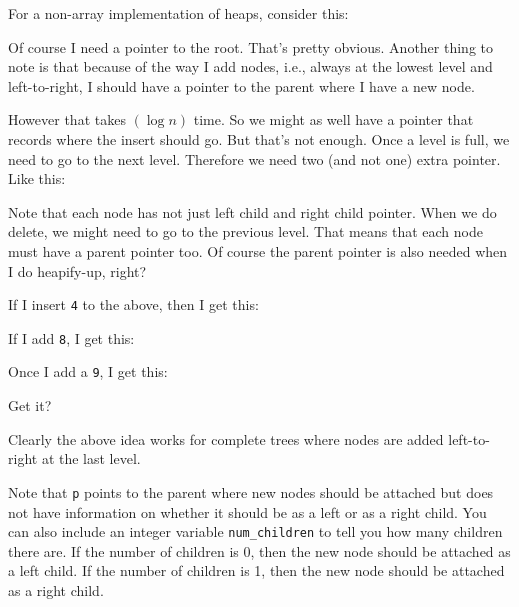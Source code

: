For a non-array implementation of heaps,
consider this:



Of course I need a pointer to the root.
That's pretty obvious.
Another thing to note is that because of the way I add nodes,
i.e., always at the lowest level and left-to-right, I should have a pointer
to the parent where I have a new node.



However that takes $(\log n)$ time.
So we might as well have a pointer that records where the
insert should go.
But that's not enough.
Once a level is full, we need to go to the next level.
Therefore we need two (and not one) extra pointer.
Like this:



Note that each node has not just left child and right child pointer.
When we do delete, we might need to go to the previous level.
That means that each node must have a parent pointer too.
Of course the parent pointer is also needed when I do heapify-up, right?

If I insert \texttt{4} to the above, then I get this:



If I add \texttt{8}, I get this:



Once I add a \texttt{9}, I get this:



Get it?

  
Clearly the above idea works for complete trees where
nodes are added left-to-right at the last level.

Note that \verb!p! points to the parent where new nodes should be
attached but does not have information on whether it should be
as a left or as a right child.
You can also include an integer variable \texttt{num\_children}
to tell you how many children
there are.
If the number of children is 0, then the new node should be
attached as a left child.
If the number of children is 1, then the new node should be attached
as a right child.




